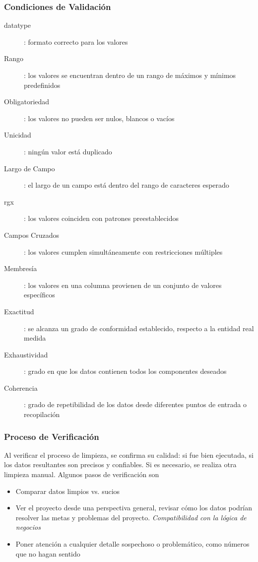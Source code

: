 \subsubsection{Condiciones de Validación}
\begin{description}
    \item [\gls{datatype}]{ : formato correcto para los valores}
    \item [Rango]{ : los valores se encuentran dentro de un rango de máximos y mínimos predefinidos}
    \item [Obligatoriedad]{ : los valores no pueden ser nulos, blancos o vacíos}
    \item [Unicidad]{ : ningún valor está duplicado}
    \item [Largo de Campo]{ : el largo de un campo está dentro del rango de caracteres esperado}
    \item [\gls{rgx}]{ : los valores coinciden con patrones preestablecidos}
    \item [Campos Cruzados]{ : los valores cumplen simultáneamente con restricciones múltiples}
    \item [Membresía]{ : los valores en una columna provienen de un conjunto de valores específicos} 
    \item [Exactitud]{ : se alcanza un grado de conformidad establecido, respecto a la entidad real medida}
    \item [Exhaustividad]{ : grado en que los datos contienen todos los componentes deseados}
    \item [Coherencia]{ : grado de repetibilidad de los datos desde diferentes puntos de entrada o recopilación}
\end{description}

\subsubsection{Proceso de Verificación}
Al verificar el proceso de limpieza, se confirma su calidad: si fue bien ejecutada, si los datos resultantes son precisos y confiables. Si es necesario, se realiza otra limpieza manual. Algunos pasos de verificación son
\begin{itemize}
    \item {Comparar datos limpios vs. sucios}
    \item {Ver el proyecto desde una perspectiva general, revisar cómo los datos podrían resolver las metas y problemas del proyecto. \textit{Compatibilidad con la lógica de negocios}}
    \item {Poner atención a cualquier detalle sospechoso o problemático, como números que no hagan sentido}
\end{itemize}

